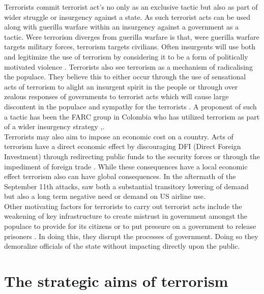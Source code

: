 Terrorists commit terrorist act's no only as an exclusive tactic but also as part of wider struggle or insurgency against a state. As such terrorist acts can be used along with guerilla warfare within an insurgency against a government as a tactic. Were terrorism diverges from guerilla warfare is that, were guerilla warfare targets military forces, terrorism targets civilians. Often insurgents will use both and legitimize the use of terrorism by considering it to be a form of politically motivated violence \citep{ganor2002defining}. Terrorists also see terrorism as a mechanism of radicalising the populace. They believe this to either occur through the use of sensational acts of terrorism to alight an insurgent spirit in the people or through over zealous responses of governments to terrorist acts which will cause large discontent in the populace and sympathy for the terrorists \citep{jenkins1985international}. A proponent of such a tactic has been the FARC group in Colombia who has utilized terrorism as part of a wider insurgency strategy  \citep{wickham1990terror},\citep{marks2002colombian}.
\\
Terrorists may also aim to impose an economic cost on a country. Acts of terrorism have a direct economic effect by discouraging DFI (Direct Foreign Investment) through  redirecting public funds to the security forces or through the impediment of foreign trade \citep{sandler2008economic}. While these consequences have a local economic effect terrorism also can have global consequences. In the aftermath of the September 11th attacks, saw both a substantial transitory lowering of demand but also a long term negative need or demand \citep{ito2005assessing} on US airline use.
\\
Other motivating factors for terrorists to carry out terrorist acts include the weakening of key infrastructure to create mistrust in government amongst the populace to provide for its citizens or to put pressure on a government to release prisoners  \citep{TerrorismTypes2016}. In doing this, they disrupt the processes of government. Doing so they demoralize officials of the state without impacting directly upon the public. 

\section{The strategic aims of terrorism}
\label{sec:chap1strataimsterr}


